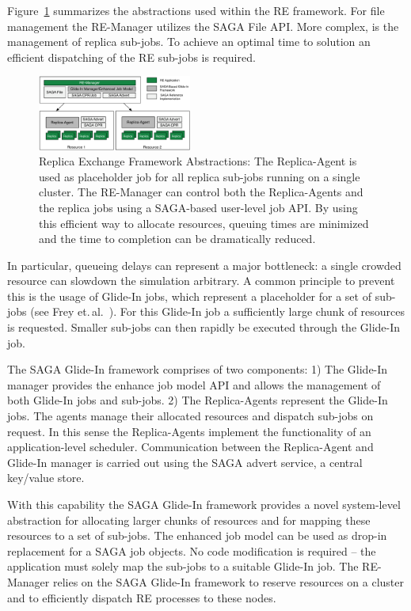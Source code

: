 \documentclass[conference,final]{IEEEtran}
\begin{document}
Figure~\ref{fig:remdmanager_v11} summarizes the abstractions used
within the RE framework.  For file management the RE-Manager utilizes
the SAGA File API. More complex, is the management of replica
sub-jobs. To achieve an optimal time to solution an efficient
dispatching of the RE sub-jobs is required.

\begin{figure}[htbp]
    \centering
        \includegraphics[width=0.45\textwidth]{remdmanager_v11.pdf}
    \caption{Replica Exchange Framework Abstractions:      
          The Replica-Agent is used as placeholder job for
          all replica sub-jobs running on a single cluster. The
          RE-Manager can control both the Replica-Agents and the replica
          jobs using a SAGA-based user-level job API. By using this
          efficient way to allocate resources, queuing times are minimized
          and the time to completion can be dramatically reduced.}
    \label{fig:remdmanager_v11}
\end{figure}  

In particular, queueing delays can represent a major bottleneck: a
single crowded resource can slowdown the simulation arbitrary. A
common principle to prevent this is the usage of Glide-In jobs, which
represent a placeholder for a set of sub-jobs (see Frey
et.\,al.~\cite{citeulike:291860}).  For this Glide-In job a
sufficiently large chunk of resources is requested. Smaller sub-jobs
can then rapidly be executed through the Glide-In job.

The SAGA Glide-In framework comprises of two components: 1) The
Glide-In manager provides the enhance job model API and allows the
management of both Glide-In jobs and sub-jobs.  2) The Replica-Agents
represent the Glide-In jobs. The agents manage their allocated
resources and dispatch sub-jobs on request. In this sense the
Replica-Agents implement the functionality of an application-level
scheduler. Communication between the Replica-Agent and Glide-In
manager is carried out using the SAGA advert service, a central
key/value store.

With this capability the SAGA Glide-In framework provides a novel
system-level abstraction for allocating larger chunks of resources and
for mapping these resources to a set of sub-jobs. The enhanced job
model can be used as drop-in replacement for a SAGA job objects. No
code modification is required -- the application must solely map the
sub-jobs to a suitable Glide-In job.  The RE-Manager relies on the
SAGA Glide-In framework to reserve resources on a cluster and to
efficiently dispatch RE processes to these nodes.
\end{document}
